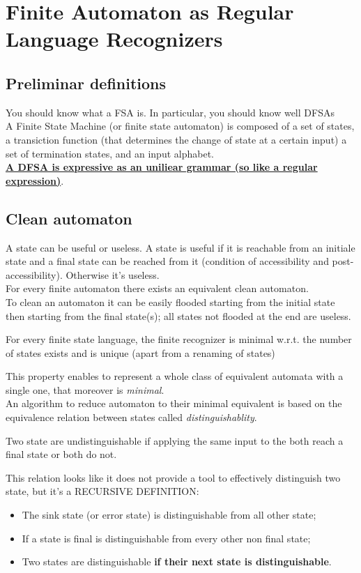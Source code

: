 \chapter{Finite Automaton as Regular Language Recognizers}
	\section{Preliminar definitions}
	You should know what a FSA is. In particular, you should know well DFSAs\\
	A Finite State Machine (or finite state automaton) is composed of a set of states, a transiction function (that determines the change of state at a certain input) a set of termination states, and an input alphabet.\\
	\textbf{\underline{A DFSA is expressive as an uniliear grammar (so like a regular expression)}}.\\
	\section{Clean automaton}
		A state can be useful or useless. A state is useful if it is reachable from an initiale state and a final state can be reached from it (condition of accessibility and post-accessibility). Otherwise it's useless.\\
		For every finite automaton there exists an equivalent clean automaton.\\
		To clean an automaton it can be easily flooded starting from the initial state then starting from the final state(s); all states not flooded at the end are useless.
	\begin{property}
		For every finite state language, the finite recognizer is minimal w.r.t. the number of states exists and is unique (apart from a renaming of states)
	\end{property}
		This property enables to represent a whole class of equivalent automata with a single one, that moreover is \emph{minimal}.\\
		An algorithm to reduce automaton to their minimal equivalent is based on the equivalence relation between states called \emph{distinguishablity}.
		\begin{definition}
			Two state are undistinguishable if applying the same input to the both reach a final state or both do not.
		\end{definition}
		 This relation looks like it does not provide a tool to effectively 
		distinguish two state, but it's a RECURSIVE DEFINITION:
		\begin{itemize}
			\item The sink state (or error state) is distinguishable from all other state;
			\item If a state is final is distinguishable from every other non final state;
			\item Two states are distinguishable \textbf{if their next state is distinguishable}.
		\end{itemize}
	
